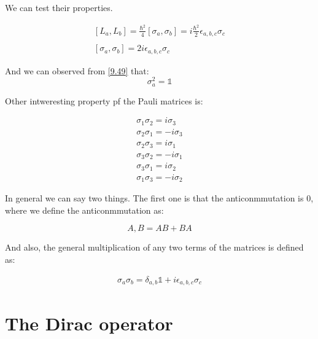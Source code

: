 We can test their properties.

\begin{equation}
  \begin{array}{c}
    \left[L_a,L_b\right] = \frac{\hbar^2}{4} \left[\sigma_a,\sigma_b\right] = i\frac{\hbar^2}{2}\epsilon_{a,b,c}\sigma_c
    \\

    \\
    \left[\sigma_a,\sigma_b\right] = 2i \epsilon_{a,b,c}\sigma_c
  \end{array}
\end{equation}

And we can observed from \ref{9.49} that:
\begin{equation}
  \sigma_a^2 = \mathbb{1}
\end{equation}

Other intweresting property pf the Pauli matrices is:

\begin{equation}
  \begin{array}{c}
    \sigma_1 \sigma_2 = i\sigma_3
    \\
    \sigma_2 \sigma_1 = -i\sigma_3
    \\
    \sigma_2 \sigma_3 = i\sigma_1
    \\
    \sigma_3 \sigma_2 = -i\sigma_1
    \\
    \sigma_3 \sigma_1 = i\sigma_2
    \\
    \sigma_1 \sigma_3 = -i\sigma_2
  \end{array}
\end{equation}

In general we can say two things. The first one is that the anticonmmutation is 0, where we define the anticonmmutation as:

\begin{equation}
  {A,B} = AB+BA
\end{equation}

And also, the general multiplication of any two terms of the matrices is defined as:

\begin{equation}
\begin{array}{c}
  \sigma_a \sigma_b = \delta_{a,b}\mathbb{1} + i\epsilon_{a,b,c}\sigma_c
\end{array}
\end{equation}

\section{The Dirac operator}

